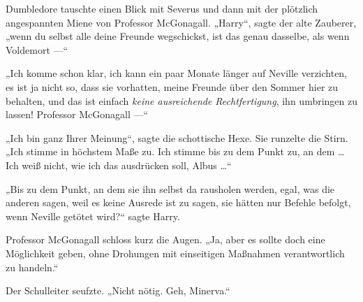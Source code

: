Dumbledore tauschte einen Blick mit Severus und dann mit der plötzlich angespannten Miene von Professor McGonagall.
„Harry“, sagte der alte Zauberer, „wenn du selbst alle deine Freunde wegschickst, ist das genau dasselbe, als wenn Voldemort —“

„Ich komme schon klar, ich kann ein paar Monate länger auf Neville verzichten, es ist ja nicht so, dass sie vorhatten, meine Freunde über den Sommer hier zu behalten, und das ist einfach \emph{keine ausreichende Rechtfertigung}, ihn umbringen zu lassen! Professor McGonagall —“

„Ich bin ganz Ihrer Meinung“, sagte die schottische Hexe. Sie runzelte die Stirn.
„Ich stimme in höchstem Maße zu. Ich stimme bis zu dem Punkt zu, an dem … Ich weiß nicht, wie ich das ausdrücken soll, Albus …“

„Bis zu dem Punkt, an dem sie ihn selbst da rausholen werden, egal, was die anderen sagen, weil es keine Ausrede ist zu sagen, sie hätten nur Befehle befolgt, wenn Neville getötet wird?“ sagte Harry.

Professor McGonagall schloss kurz die Augen.
„Ja, aber es sollte doch eine Möglichkeit geben, ohne Drohungen mit einseitigen Maßnahmen verantwortlich zu handeln.“

Der Schulleiter seufzte.
„Nicht nötig. Geh, Minerva.“

